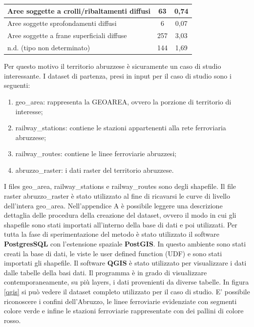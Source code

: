 \begin{table}[h]
\begin{tabular}{|l|c|c|}
		Aree soggette a crolli/ribaltamenti diffusi                                                     & 63                                       & 0,74                               \\ \hline
		Aree soggette sprofondamenti diffusi                                                            & 6                                        & 0,07                               \\ \hline
		Aree soggette a frane superficiali diffuse                                                      & 257                                      & 3,03                               \\ \hline
		n.d. (tipo non determinato)                                                                     & 144                                      & 1,69                               \\ \hline
	\end{tabular}
\end{table}


Per questo motivo il territorio abruzzese è sicuramente un caso di studio interessante.
I dataset di partenza, presi in input per il caso di studio sono i seguenti:
\begin{enumerate}
	\item geo\_area: rappresenta la GEOAREA, ovvero la porzione di territorio di interesse;
	\item railway\_stations: contiene le stazioni appartenenti alla rete ferroviaria abruzzese;
	\item railway\_routes: contiene le linee ferroviarie abruzzesi;
	\item abruzzo\_raster: i dati raster del territorio abruzzese.
\end{enumerate}
I files geo\_area, railway\_stations e railway\_routes sono degli shapefile. Il file raster abruzzo\_raster è stato utilizzato al fine di ricavarsi le curve di livello dell'intera geo\_area. Nell'appendice A è possibile leggere una descrizione dettaglia delle procedura della creazione del dataset, ovvero il modo in cui gli shapefile sono stati importati all'interno della base di dati e poi utilizzati.
Per tutta la fase di sperimentazione del metodo è stato utilizzato il software \textbf{PostgresSQL} con l’estensione spaziale \textbf{PostGIS}. In questo ambiente sono stati creati la base di dati, le viste le user defined function (UDF) e sono stati importati gli shapefile. Il software \textbf{QGIS} è stato utilizzato per visualizzare i dati dalle tabelle della basi dati. Il programma è in grado di visualizzare contemporaneamente, su più layers, i dati provenienti da diverse tabelle. In figura \ref{qgis} si può vedere il dataset completo utilizzato per il caso di studio. E' possibile riconoscere i confini dell'Abruzzo, le linee ferroviarie evidenziate con segmenti colore verde e infine le stazioni ferroviarie rappresentate con dei pallini di colore rosso.

